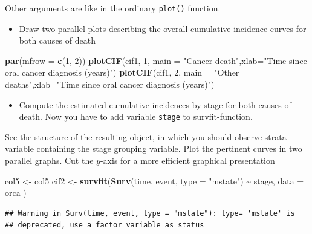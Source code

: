 \documentclass[
]{book}
\newenvironment{Shaded}{\begin{snugshade}}{\end{snugshade}}
\newcommand{\AttributeTok}[1]{\textcolor[rgb]{0.13,0.29,0.53}{#1}}
\newcommand{\DecValTok}[1]{\textcolor[rgb]{0.00,0.00,0.81}{#1}}
\newcommand{\FunctionTok}[1]{\textcolor[rgb]{0.13,0.29,0.53}{\textbf{#1}}}
\newcommand{\NormalTok}[1]{#1}
\newcommand{\OtherTok}[1]{\textcolor[rgb]{0.56,0.35,0.01}{#1}}
\newcommand{\SpecialCharTok}[1]{\textcolor[rgb]{0.81,0.36,0.00}{\textbf{#1}}}
\newcommand{\StringTok}[1]{\textcolor[rgb]{0.31,0.60,0.02}{#1}}
\providecommand{\tightlist}{%
  \setlength{\itemsep}{0pt}\setlength{\parskip}{0pt}}
\begin{document}
Other arguments are like in the ordinary \texttt{plot()} function.

\begin{itemize}
\tightlist
\item
  Draw two parallel plots describing
  the overall cumulative incidence curves for both causes of death
\end{itemize}

\begin{Shaded}
\begin{Highlighting}[]
\FunctionTok{par}\NormalTok{(}\AttributeTok{mfrow =} \FunctionTok{c}\NormalTok{(}\DecValTok{1}\NormalTok{, }\DecValTok{2}\NormalTok{))}
\FunctionTok{plotCIF}\NormalTok{(cif1, }\DecValTok{1}\NormalTok{, }\AttributeTok{main =} \StringTok{"Cancer death"}\NormalTok{,}\AttributeTok{xlab=}\StringTok{"Time since oral cancer diagnosis (years)"}\NormalTok{)}
\FunctionTok{plotCIF}\NormalTok{(cif1, }\DecValTok{2}\NormalTok{, }\AttributeTok{main =} \StringTok{"Other deaths"}\NormalTok{,}\AttributeTok{xlab=}\StringTok{"Time since oral cancer diagnosis (years)"}\NormalTok{)}
\end{Highlighting}
\end{Shaded}

\begin{itemize}
\tightlist
\item
  Compute the estimated
  cumulative incidences by stage for both causes of death.
  Now you have to add variable \texttt{stage} to survfit-function.
\end{itemize}

See the structure of the resulting object, in which you should
observe strata variable containing the stage grouping variable. Plot the pertinent curves in two parallel graphs.
Cut the \(y\)-axis for a more efficient graphical presentation

\begin{Shaded}
\begin{Highlighting}[]
\NormalTok{col5 }\OtherTok{\textless{}{-}}\NormalTok{ col5}
\NormalTok{cif2 }\OtherTok{\textless{}{-}} \FunctionTok{survfit}\NormalTok{(}\FunctionTok{Surv}\NormalTok{(time, event, }\AttributeTok{type =} \StringTok{"mstate"}\NormalTok{) }\SpecialCharTok{\textasciitilde{}}\NormalTok{ stage,}
  \AttributeTok{data =}\NormalTok{ orca}
\NormalTok{)}
\end{Highlighting}
\end{Shaded}

\begin{verbatim}
## Warning in Surv(time, event, type = "mstate"): type= 'mstate' is
## deprecated, use a factor variable as status
\end{verbatim}
\end{document}
